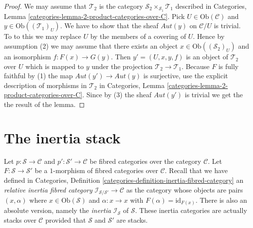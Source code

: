 \begin{proof}
We may assume that $\mathcal{T}_2$ is the category
$\mathcal{S}_2 \times_{\mathcal{S}_1} \mathcal{T}_1$
described in
Categories, Lemma \ref{categories-lemma-2-product-categories-over-C}.
Pick $U \in \text{Ob}(\mathcal{C})$ and
$y \in \text{Ob}((\mathcal{T}_1)_U)$.
We have to show that the sheaf $\textit{Aut}(y)$ on $\mathcal{C}/U$
is trivial. To to this we may replace $U$ by the members of
a covering of $U$. Hence by assumption (2) we may assume that
there exists an object $x \in \text{Ob}((\mathcal{S}_2)_U)$
and an isomorphism $f : F(x) \to G(y)$.
Then $y' = (U, x, y, f)$ is an object of $\mathcal{T}_2$ over $U$
which is mapped to $y$ under the projection $\mathcal{T}_2 \to \mathcal{T}_1$.
Because $F$ is fully faithful by (1) the map
$\textit{Aut}(y') \to \textit{Aut}(y)$ is surjective, use the explicit
description of morphisms in $\mathcal{T}_2$ in
Categories, Lemma \ref{categories-lemma-2-product-categories-over-C}.
Since by (3) the sheaf $\textit{Aut}(y')$ is trivial
we get the the result of the lemma.
\end{proof}








\section{The inertia stack}
\label{section-the-inertia-stack}

\noindent
Let
$p : \mathcal{S} \to \mathcal{C}$ and
$p' : \mathcal{S}' \to \mathcal{C}$
be fibred categories over the category $\mathcal{C}$.
Let $F : \mathcal{S} \to \mathcal{S}'$ be a $1$-morphism of
fibred categories over $\mathcal{C}$.
Recall that we have defined in
Categories, Definition \ref{categories-definition-inertia-fibred-category}
an {\it relative inertia fibred category}
$\mathcal{I}_{\mathcal{S}/\mathcal{S}'} \to \mathcal{C}$ as the
category whose objects are pairs $(x ,\alpha)$ where
$x \in \text{Ob}(\mathcal{S})$ and $\alpha : x \to x$ with
$F(\alpha) = \text{id}_{F(x)}$. There is also an absolute version,
namely the {\it inertia} $\mathcal{I}_{\mathcal{S}}$ of $\mathcal{S}$.
These inertia categories are actually stacks over $\mathcal{C}$ provided
that $\mathcal{S}$ and $\mathcal{S}'$ are stacks.

